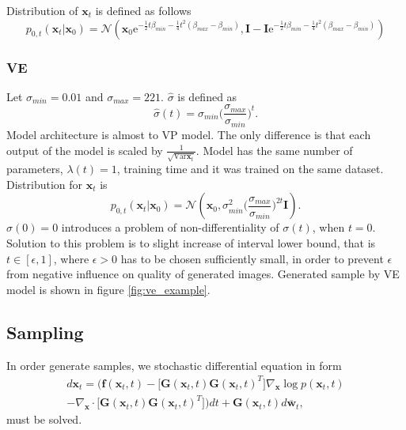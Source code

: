 \documentclass[10pt]{article}
\begin{document}
Distribution of $\textbf{x}_t$ is defined as follows 
\begin{equation}
       p_{0,t}(\textbf{x}_t |\textbf{x}_0 ) =
    \mathcal{N}(\textbf{x}_0 \text{e}^{-\frac{1}{2} t\beta_{min} - \frac{1}{4} t^2(\beta_{max} - \beta_{min} )},
    \mathbf{I} - \mathbf{I}\text{e}^{-\frac{1}{2} t\beta_{min} - \frac{1}{4} t^2(\beta_{max} - \beta_{min} )})
\end{equation}
 
\subsubsection{VE}
Let $\sigma_{min} =0.01$ and $\sigma_{max} = 221$. $\hat{\sigma}$ is defined as 
\begin{equation}
   \hat{\sigma}(t) = \sigma_{min} \Big( \frac{\sigma_{max}}{\sigma_{min}} \Big)^t.
\end{equation}
Model architecture is almost to VP model. The only difference is that each output of the model is scaled by $\frac{1}{\sqrt{ \text{Var}\textbf{x}_t } }$. Model has the same number of parameters, $\lambda(t) = 1$, training time and it was trained on the same dataset. Distribution for $\textbf{x}_t$ is
\begin{equation}
    p_{0,t}(\textbf{x}_t |\textbf{x}_0 ) = \mathcal{N}(\textbf{x}_0, \sigma_{min}^2 \Big( \frac{\sigma_{max}}{\sigma_{min}} \Big)^{2t}\mathbf{I}).
\end{equation}
 $\sigma(0) = 0 $ introduces a problem of non-differentiality of  $\sigma(t)$, when $t = 0$. Solution to this problem is to slight increase of interval lower bound,  that is $t \in [\epsilon, 1]$, where $\epsilon >0 $ has to be chosen sufficiently small, in order to prevent $\epsilon$ from negative influence on quality of generated images. Generated sample by VE model is shown in figure \ref{fig:ve_example}.

\subsection{Sampling}
In order generate samples, we stochastic differential equation in form 
\begin{equation}
\begin{gathered}
     d \textbf{x}_t = \Big(
     \textbf{f}(\textbf{x}_t , t) - \Big[ \textbf{G}(\textbf{x}_t, t) \textbf{G}(\textbf{x}_t, t) ^T \Big] 
    \nabla_{\textbf{x}} \log p(\textbf{x}_t , t) \\
    - \nabla_{\textbf{x}}  \cdot  \Big[ \textbf{G}(\textbf{x}_t, t) \textbf{G}(\textbf{x}_t, t) ^T \Big] \Big) dt + \textbf{G} (\textbf{x}_t , t)
        d \overline{\textbf{w}} _t,
\end{gathered}
\end{equation}
must be solved.
\end{document}
